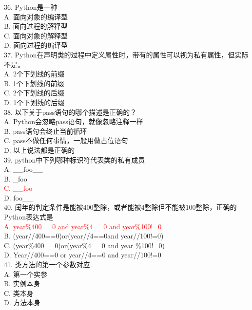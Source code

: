 \documentclass[6pt]{article}
\begin{document}
36. Python是一种\\

A. 面向对象的编译型\\
B. 面向过程的解释型\\
C. 面向对象的解释型\\
D. 面向过程的编译型\\

37. Python在声明类的过程中定义属性时，带有的属性可以视为私有属性，但实际不是。\\

A. 2个下划线的前缀\\
B. 1个下划线的前缀\\
C. 2个下划线的后缀\\
D. 1个下划线的后缀\\

38. 以下关于pass语句的哪个描述是正确的？\\

A. Python会忽略pass语句，就像忽略注释一样\\
B. pass语句会终止当前循环\\
C. pass不做任何事情，一般用做占位语句\\
D. 以上说法都是正确的\\

39. python中下列哪种标识符代表类的私有成员\\

A. \_\_foo\_\_\\
B. \_foo\\
\textcolor{red}{C. \_\_foo}\\
D. foo\_\_\\

40. 闰年的判定条件是能被400整除，或者能被4整除但不能被100整除，正确的Python表达式是\\

\textcolor{red}{A. year\%400==0 and year\%4==0 and year\%100!=0} \\
B. (year//400==0)or(year//4==0and year//100!=0)\\
C. (year\%400==0)or(year\%4==0 and year \%100!=0) \\
D. Year//400==0 or year//4==0 and year//100!=0 \\

41. 类方法的第一个参数对应\\

A. 第一个实参\\
B. 实例本身\\
C. 类本身\\
D. 方法本身\\
\end{document}
